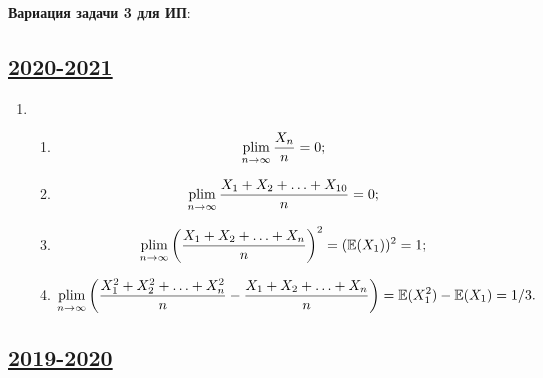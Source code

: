 \textbf{Вариация задачи 3 для ИП}:





\subsection[2020-2021]{\hyperref[sec:sol_kr_02_2020_2021]{2020-2021}}
\label{sec:sol_kr_02_2020_2021}

\begin{enumerate}
	\item 
	\begin{enumerate}
		\item 
		\[
			\operatorname*{plim}_{n\to\infty} \frac{X_n}{n} = 0;
		\]
		\item 
		\[ 
			\operatorname*{plim}_{n\to\infty} \frac{X_1 + X_2 + \ldots + X_{10}}{n} = 0;
		\]
		\item 
		\[
			 \operatorname*{plim}_{n\to\infty} \left(\frac{X_1 + X_2 + \ldots + X_n}{n}\right)^2 = (\operatorname{\mathbb{E}}(X_1))^2 = 1;
		\]
		
		\item 
		\[
			 \operatorname*{plim}_{n\to\infty} \left(\frac{X_1^2 + X_2^2 + \ldots + X_{n}^2}{n} - \frac{X_1 + X_2 + \ldots + X_{n}}{n}\right) = \operatorname{\mathbb{E}}(X_1^2) - \operatorname{\mathbb{E}}(X_1) = 1/3.
		\]
	\end{enumerate}

\end{enumerate}


\subsection[2019-2020]{\hyperref[sec:kr_02_2019_2020]{2019-2020}}
\label{sec:sol_kr_02_2019_2020}

